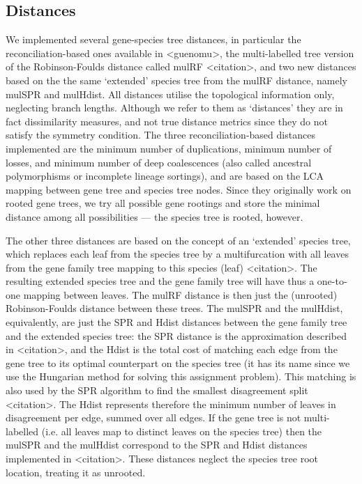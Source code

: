 \subsection{Distances}
We implemented several gene-species tree distances, in particular the reconciliation-based ones available in <guenomu>,
the multi-labelled tree version of the Robinson-Foulds distance called mulRF <citation>, and  two new distances based on
the the same ‘extended’ species tree from the mulRF distance, namely mulSPR and mulHdist. All distances utilise the
topological information only, neglecting branch lengths. Although we refer to them as ‘distances’ they are in fact
dissimilarity measures, and not true distance metrics since they do not satisfy the symmetry condition. The three
reconciliation-based distances implemented are the minimum number of duplications, minimum number of losses, and minimum
number of deep coalescences (also called ancestral polymorphisms or incomplete lineage sortings), and are based on the
LCA mapping between gene tree and species tree nodes. Since they originally work on rooted gene trees, we try all
possible gene rootings and store the minimal distance among all possibilities --- the species tree is rooted, however.

The other three distances are based on the concept of an ‘extended’ species tree, which replaces each leaf from the
species tree by a multifurcation with all leaves from the gene family tree mapping to this species (leaf) <citation>.
The resulting extended species tree and the gene family tree will have thus a one-to-one mapping between leaves. The
mulRF distance is then just the (unrooted) Robinson-Foulds distance between these trees. The mulSPR and the mulHdist,
equivalently, are just the SPR and Hdist distances between the gene family tree and the extended species tree: the SPR
distance is the approximation described in <citation>, and the Hdist is the total cost of matching each edge from the
gene tree to its optimal counterpart on the species tree (it has its name since we use the Hungarian method for solving
this assignment problem). This matching is also used by the SPR algorithm to find the smallest disagreement split
<citation>. The Hdist represents therefore the minimum number of leaves in disagreement per edge, summed over all edges.
If the gene tree is not multi-labelled (i.e. all leaves map to distinct leaves on the species tree) then the mulSPR and
the mulHdist correspond to the SPR and Hdist distances implemented in <citation>. These distances neglect the species
tree root location, treating it as unrooted.

